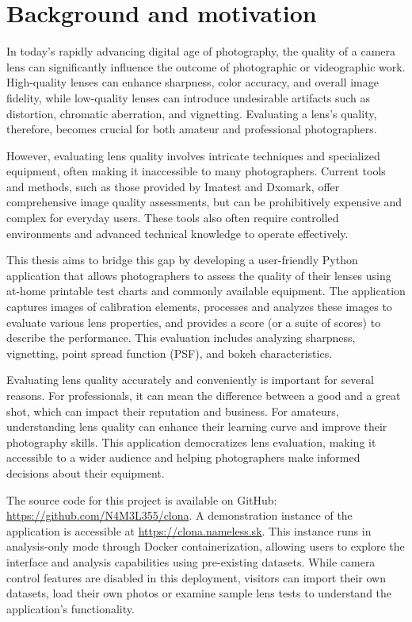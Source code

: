 \section*{Background and motivation}
In today's rapidly advancing digital age of photography, the quality of a camera lens can significantly influence the outcome of photographic or videographic work. High-quality lenses can enhance sharpness, color accuracy, and overall image fidelity, while low-quality lenses can introduce undesirable artifacts such as distortion, chromatic aberration, and vignetting. Evaluating a lens's quality, therefore, becomes crucial for both amateur and professional photographers.

However, evaluating lens quality involves intricate techniques and specialized equipment, often making it inaccessible to many photographers. Current tools and methods, such as those provided by Imatest and Dxomark, offer comprehensive image quality assessments, but can be prohibitively expensive and complex for everyday users. These tools also often require controlled environments and advanced technical knowledge to operate effectively.

This thesis aims to bridge this gap by developing a user-friendly Python application that allows photographers to assess the quality of their lenses using at-home printable test charts and commonly available equipment. The application captures images of calibration elements, processes and analyzes these images to evaluate various lens properties, and provides a score (or a suite of scores) to describe the performance. This evaluation includes analyzing sharpness, vignetting, point spread function (PSF), and bokeh characteristics.


Evaluating lens quality accurately and conveniently is important for several reasons. For professionals, it can mean the difference between a good and a great shot, which can impact their reputation and business. For amateurs, understanding lens quality can enhance their learning curve and improve their photography skills. This application democratizes lens evaluation, making it accessible to a wider audience and helping photographers make informed decisions about their equipment.



The source code for this project is available on GitHub: \url{https://github.com/N4M3L355/clona}. A demonstration instance of the application is accessible at \url{https://clona.nameless.sk}. This instance runs in analysis-only mode through Docker containerization, allowing users to explore the interface and analysis capabilities using pre-existing datasets. While camera control features are disabled in this deployment, visitors can import their own datasets, load their own photos or examine sample lens tests to understand the application's functionality.

